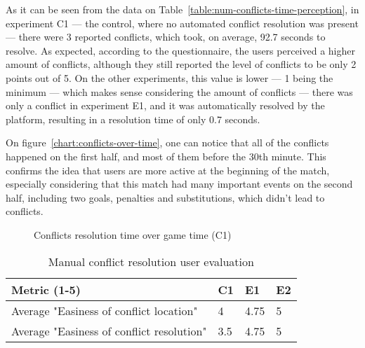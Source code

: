 As it can be seen from the data on Table~\ref{table:num-conflicts-time-perception}, in experiment C1 --- the control, where no automated conflict resolution was present --- there were 3 reported conflicts, which took, on average, 92.7 seconds to resolve. As expected, according to the questionnaire, the users perceived a higher amount of conflicts, although they still reported the level of conflicts to be only 2 points out of 5. On the other experiments, this value is lower --- 1 being the minimum --- which makes sense considering the amount of conflicts --- there was only a conflict in experiment E1, and it was automatically resolved by the platform, resulting in a resolution time of only 0.7 seconds.

On figure~\ref{chart:conflicts-over-time}, one can notice that all of the conflicts happened on the first half, and most of them before the 30th minute. This confirms the idea that users are more active at the beginning of the match, especially considering that this match had many important events on the second half, including two goals, penalties and substitutions, which didn't lead to conflicts.

\begin{figure}
    \centering
    \caption{Conflicts resolution time over game time (C1)}
    \label{chart:conflicts-res-time-over-time}
\end{figure}

\begin{table}
    \centering
    \caption{Manual conflict resolution user evaluation}
    \begin{tabular}{|l|l|l|l|}
        \hline
        \textbf{Metric (1-5)}                        & \textbf{C1} & \textbf{E1} & \textbf{E2} \\ \hline \hline
        Average "Easiness of conflict location"   & 4  & 4.75  & 5  \\ \hline
        Average "Easiness of conflict resolution"   & 3.5  & 4.75  & 5  \\ \hline
    \end{tabular}
    \label{table:conflicts-resolution-user-perception}
\end{table}

